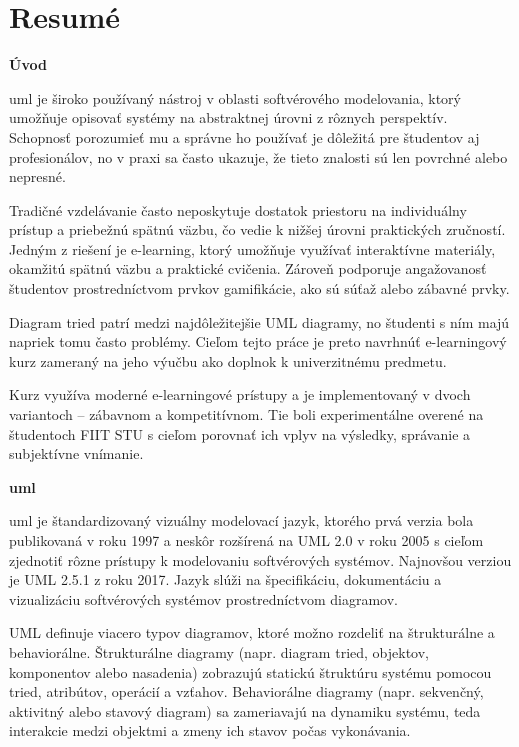 \chapter*{Resumé}
\label{chapter:resume}

\textbf{Úvod}

\ac{uml} je široko používaný nástroj v oblasti softvérového modelovania, ktorý umožňuje opisovať systémy na abstraktnej úrovni z rôznych perspektív. Schopnosť porozumieť mu a správne ho používať je dôležitá pre študentov aj profesionálov, no v praxi sa často ukazuje, že tieto znalosti sú len povrchné alebo nepresné.

Tradičné vzdelávanie často neposkytuje dostatok priestoru na individuálny prístup a priebežnú spätnú väzbu, čo vedie k nižšej úrovni praktických zručností. Jedným z riešení je e-learning, ktorý umožňuje využívať interaktívne materiály, okamžitú spätnú väzbu a praktické cvičenia. Zároveň podporuje angažovanosť študentov prostredníctvom prvkov gamifikácie, ako sú súťaž alebo zábavné prvky.

Diagram tried patrí medzi najdôležitejšie UML diagramy, no študenti s ním majú napriek tomu často problémy. Cieľom tejto práce je preto navrhnúť e-learningový kurz zameraný na jeho výučbu ako doplnok k univerzitnému predmetu.

Kurz využíva moderné e-learningové prístupy a je implementovaný v dvoch variantoch – zábavnom a kompetitívnom. Tie boli experimentálne overené na študentoch FIIT STU s cieľom porovnať ich vplyv na výsledky, správanie a subjektívne vnímanie.

\textbf{\ac{uml}}

\ac{uml} je štandardizovaný vizuálny modelovací jazyk, ktorého prvá verzia bola publikovaná v roku 1997 a neskôr rozšírená na UML 2.0 v roku 2005 s cieľom zjednotiť rôzne prístupy k modelovaniu softvérových systémov. Najnovšou verziou je UML 2.5.1 z roku 2017. Jazyk slúži na špecifikáciu, dokumentáciu a vizualizáciu softvérových systémov prostredníctvom diagramov.


UML definuje viacero typov diagramov, ktoré možno rozdeliť na štrukturálne a behaviorálne. Štrukturálne diagramy (napr. diagram tried, objektov, komponentov alebo nasadenia) zobrazujú statickú štruktúru systému pomocou tried, atribútov, operácií a vzťahov. Behaviorálne diagramy (napr. sekvenčný, aktivitný alebo stavový diagram) sa zameriavajú na dynamiku systému, teda interakcie medzi objektmi a zmeny ich stavov počas vykonávania.

